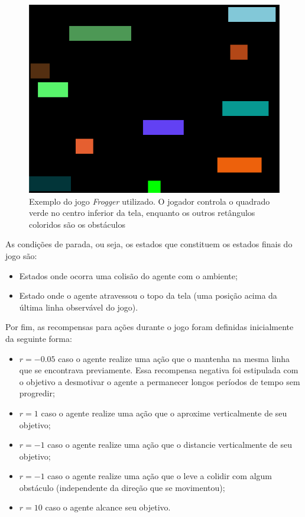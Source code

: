 \begin{figure}[h]
  \centering
  \includegraphics[width=.6 \textwidth]{conteudo/imgs/frogg_ini_state.png}
  \caption[Jogo \textit{Frogger}]{Exemplo do jogo \textit{Frogger} utilizado. O jogador controla o quadrado verde no centro inferior da tela, enquanto os outros retângulos coloridos são os obstáculos}
  \label{fig:frogg}
\end{figure} 

 As condições de parada, ou seja, os estados que constituem os estados finais do jogo são:

 \begin{itemize}
   \item Estados onde ocorra uma colisão do agente com o ambiente;
   \item Estado onde o agente atravessou o topo da tela (uma posição acima da última linha observável do jogo).
 \end{itemize}

 Por fim, as recompensas para ações durante o jogo foram definidas inicialmente da seguinte forma:

 \begin{itemize}
 	\item $r=-0.05$ caso o agente realize uma ação que o mantenha na mesma linha que se encontrava previamente. Essa recompensa negativa foi estipulada com o objetivo a desmotivar o agente a permanecer longos períodos de tempo sem progredir;
 	\item $r=1$ caso o agente realize uma ação que o aproxime verticalmente de seu objetivo;
  \item $r=-1$ caso o agente realize uma ação que o distancie verticalmente de seu objetivo;
 	\item $r=-1$ caso o agente realize uma ação que o leve a colidir com algum obstáculo (independente da direção que se movimentou);
 	\item $r=10$ caso o agente alcance seu objetivo.
 \end{itemize}

